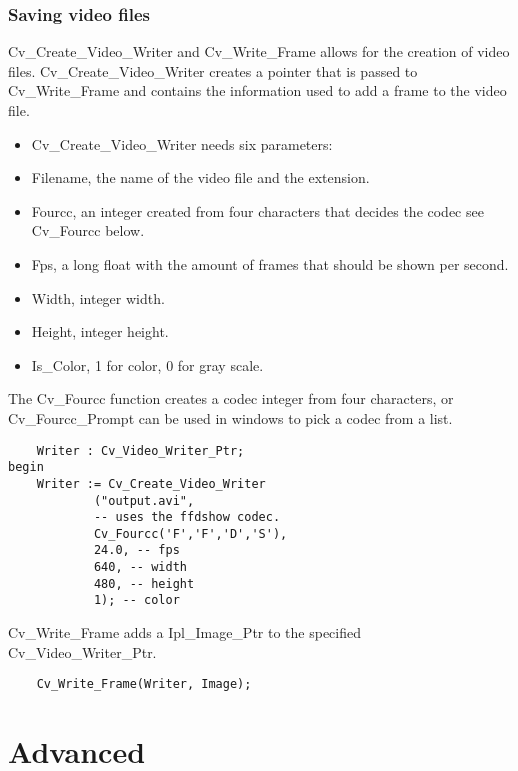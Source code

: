 \subsubsection{Saving video files}
Cv_Create_Video_Writer and Cv_Write_Frame allows for the creation of video files. Cv_Create_Video_Writer creates a pointer that is passed to Cv_Write_Frame and contains the information used to add a frame to the video file.
\begin{itemize}
\item Cv_Create_Video_Writer needs six parameters:
\item Filename, the name of the video file and the extension.
\item Fourcc, an integer created from four characters that decides the codec see Cv_Fourcc below.
\item Fps, a long float with the amount of frames that should be shown per second.
\item Width, integer width.
\item Height, integer height.
\item Is_Color, 1 for color, 0 for gray scale.
\end{itemize}
The Cv_Fourcc function creates a codec integer from four characters, or Cv_Fourcc_Prompt can be used in windows to pick a codec from a list.
\begin{lstlisting}
	Writer : Cv_Video_Writer_Ptr;
begin
	Writer := Cv_Create_Video_Writer 
			("output.avi",
			-- uses the ffdshow codec.
 			Cv_Fourcc('F','F','D','S'),
			24.0, -- fps
			640, -- width
			480, -- height
			1); -- color
\end{lstlisting}
Cv_Write_Frame adds a Ipl_Image_Ptr to the specified Cv_Video_Writer_Ptr.
\begin{lstlisting}
	Cv_Write_Frame(Writer, Image);
\end{lstlisting}
\section{Advanced}
